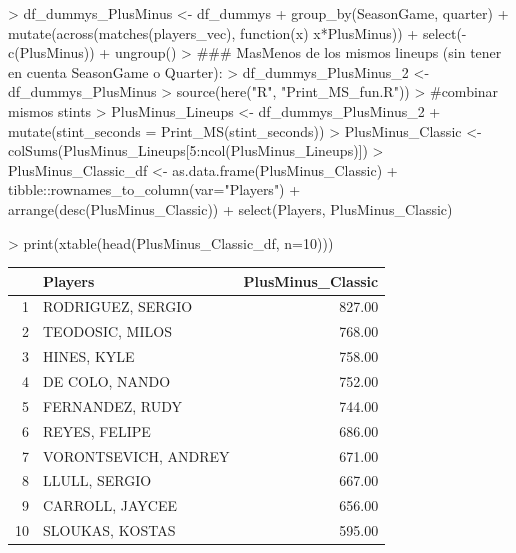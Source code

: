 \documentclass[paper=a4, fontsize=9pt]{article}
\begin{document}
\begin{landscape}
\end{landscape}

\begin{Schunk}
\end{Schunk}

\begin{Schunk}
\begin{Sinput}
> df_dummys_PlusMinus <- df_dummys %
+   group_by(SeasonGame, quarter) %
+   mutate(across(matches(players_vec), function(x) x*PlusMinus)) %
+   select(-c(PlusMinus)) %
+   ungroup()
> ### MasMenos de los mismos lineups (sin tener en cuenta SeasonGame o Quarter):
> df_dummys_PlusMinus_2 <- df_dummys_PlusMinus %
> source(here("R", "Print_MS_fun.R"))
> #combinar mismos stints
> PlusMinus_Lineups <- df_dummys_PlusMinus_2 %
+                      mutate(stint_seconds = Print_MS(stint_seconds))
> PlusMinus_Classic <- colSums(PlusMinus_Lineups[5:ncol(PlusMinus_Lineups)])
> PlusMinus_Classic_df <- as.data.frame(PlusMinus_Classic) %
+   tibble::rownames_to_column(var="Players") %
+   arrange(desc(PlusMinus_Classic)) %
+   select(Players, PlusMinus_Classic)
\end{Sinput}
\end{Schunk}


\begin{Schunk}
\begin{Sinput}
> print(xtable(head(PlusMinus_Classic_df, n=10)))
\end{Sinput}
\begin{table}[ht]
\centering
\begin{tabular}{rlr}
  \hline
 & Players & PlusMinus\_Classic \\ 
  \hline
1 & RODRIGUEZ, SERGIO & 827.00 \\ 
  2 & TEODOSIC, MILOS & 768.00 \\ 
  3 & HINES, KYLE & 758.00 \\ 
  4 & DE COLO, NANDO & 752.00 \\ 
  5 & FERNANDEZ, RUDY & 744.00 \\ 
  6 & REYES, FELIPE & 686.00 \\ 
  7 & VORONTSEVICH, ANDREY & 671.00 \\ 
  8 & LLULL, SERGIO & 667.00 \\ 
  9 & CARROLL, JAYCEE & 656.00 \\ 
  10 & SLOUKAS, KOSTAS & 595.00 \\ 
   \hline
\end{tabular}
\end{table}\end{Schunk}
\end{document}
